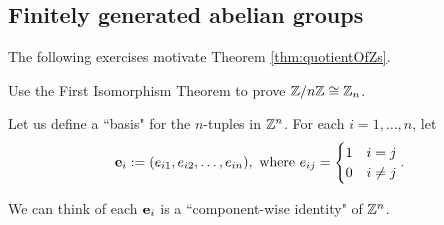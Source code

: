 \documentclass[../algebraNotesMSRI-UP2016.tex]{subfiles}
\begin{document}

\subsection[\subsecname]{Finitely generated abelian groups}\label{subsec:FGAG}
\begin{frame}{\subsecname}{}
The following exercises motivate Theorem \ref{thm:quotientOfZs}.

\smallGap
\begin{exe}[cf. Problem 74]\label{exe:prob74}
Use the First Isomorphism Theorem to prove $\mathbb Z/n\mathbb Z\cong \mathbb Z_n$.
\end{exe}

\smallGap
Let us define a ``basis" for the $n$-tuples in $\mathbb Z^n$.  For each $i=1,\dots,n$, let 
\[
\mathbf e_i := (e_{i1},e_{i2},\dots,e_{in}), \text{ where }e_{ij}=\begin{cases}
	1 & i=j \\
	0 & i\neq j
	\end{cases}.
\]

\smallGap
We can think of each $\mathbf e_i$ is a ``component-wise identity" of $\mathbb Z^n$.
\end{frame}
\end{document}
